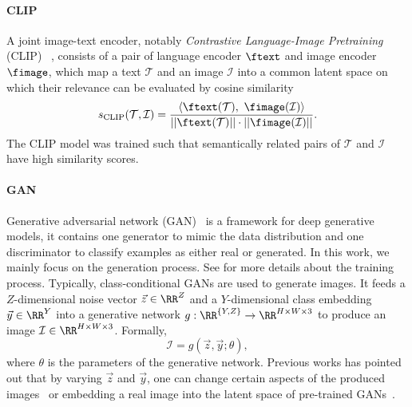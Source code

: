 \documentclass[10pt,twocolumn,letterpaper]{article}
\begin{document}
\paragraph{CLIP}
A joint image-text encoder, 
notably \emph{Contrastive Language-Image Pretraining} (CLIP) ~\cite{radford2021learning}, 
consists of a pair of 
language encoder $\ftext$ and image encoder $\fimage$, 
which map a text $\mathcal{T}$ and an image $\mathcal I$ 
into a common latent space on which their relevance can be evaluated by cosine similarity 
\begin{equation}
    s_{\text{CLIP}}(\mathcal{T}, \mathcal{I}) = \frac{\left < \ftext(\mathcal{T}),~\fimage(\mathcal{I}) \right >}{||\ftext(\mathcal{T})||\cdot||\fimage(\mathcal{I})||}. 
\end{equation}
The CLIP model was trained such that 
semantically related  pairs of $\mathcal{T}$ and  $\mathcal{I}$
have high similarity scores. 
\iffalse 
\paragraph{GAN} Generative adversarial network (GAN)~\cite{goodfellow2014generative} is a framework for deep generative models, it contains one generator to mimic the data distribution and one discriminator to classify examples as either real or generated.
In this work, we mainly focus on the generation process.
See \cite{goodfellow2014generative, reed2016generative, abdal2019image2stylegan} for more details about the training process.
Typically, class-conditional GANs \cite{dai2017towards} are used to generate images. It feeds a $Z$-dimensional noise vector $\vec{z} \in \RR^Z$ and a $Y$-dimensional class embedding $\vec{y} \in \RR^Y$ into a generative network $g: \RR^{\{Y, Z\}} \to \RR^{H \times W \times 3}$ to produce an image $\mathcal{I} \in \RR^{H \times W \times 3}$.
Formally,
\begin{equation}
    \mathcal{I} = g(\vec{z}, \vec{y} ; \theta),
\end{equation}
where $\theta$ is the parameters of the generative network. Previous works has pointed out that by varying $\vec{z}$ and $\vec{y}$, one can change certain aspects of the produced images~\cite{plumerault2020controlling, harkonen2020ganspace} or embedding a real image into the latent space of pre-trained GANs~\cite{abdal2019image2stylegan, huh2020transforming}. 
\end{document}
